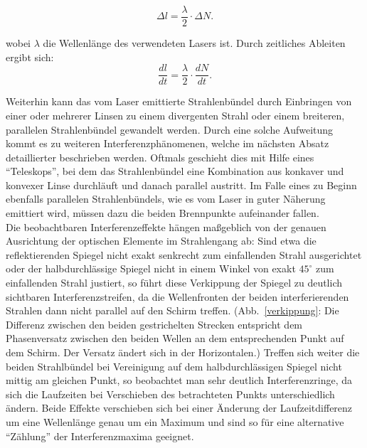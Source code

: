 \begin{equation}
\Delta l = \frac{\lambda}{2} \cdot \Delta N. 
\label{form:ausdzumax_1}
\end{equation}


wobei $ \lambda $ die Wellenlänge des verwendeten Lasers ist. 
Durch zeitliches Ableiten ergibt sich:
\begin{equation}
\frac{dl}{dt} = \frac{\lambda}{2} \cdot \frac{dN}{dt}.
\label{form:ausdzumax}
\end{equation}


Weiterhin kann das vom Laser emittierte Strahlenbündel durch Einbringen von einer oder mehrerer Linsen zu einem 
divergenten Strahl oder einem breiteren, parallelen Strahlenbündel gewandelt werden. Durch eine solche Aufweitung kommt es 
zu weiteren Interferenzphänomenen, welche im nächsten Absatz detaillierter beschrieben werden. Oftmals geschieht dies mit 
Hilfe eines \enquote{Teleskops}, bei dem das Strahlenbündel eine Kombination aus konkaver und konvexer Linse 
durchläuft und danach parallel austritt. Im Falle eines zu Beginn ebenfalls parallelen Strahlenbündels, wie es 
vom Laser in guter Näherung emittiert wird, müssen dazu die beiden Brennpunkte aufeinander fallen.  \\

Die beobachtbaren Interferenzeffekte hängen maßgeblich von der genauen Ausrichtung der optischen Elemente im 
Strahlengang ab: 
Sind etwa die reflektierenden Spiegel nicht exakt senkrecht zum einfallenden Strahl ausgerichtet oder der 
halbdurchlässige Spiegel nicht in einem Winkel von exakt $ 45 ^\circ$  zum einfallenden Strahl justiert, so 
führt diese Verkippung der Spiegel zu deutlich sichtbaren Interferenzstreifen, da die Wellenfronten der beiden 
interferierenden Strahlen dann nicht parallel auf den Schirm treffen. (Abb.~\ref{verkippung}: Die Differenz 
zwischen den beiden gestrichelten Strecken entspricht dem Phasenversatz zwischen den beiden Wellen an dem 
entsprechenden Punkt auf dem Schirm. Der Versatz ändert sich in der Horizontalen.) Treffen sich weiter die 
beiden Strahlbündel bei Vereinigung auf dem halbdurchlässigen Spiegel nicht mittig am gleichen Punkt, so 
beobachtet man sehr deutlich Interferenzringe, da sich die Laufzeiten bei Verschieben des betrachteten 
Punkts unterschiedlich ändern. Beide Effekte verschieben sich bei einer Änderung der Laufzeitdifferenz um eine Wellenlänge
genau um ein Maximum und sind so für eine alternative \enquote{Zählung} der Interferenzmaxima geeignet. 

